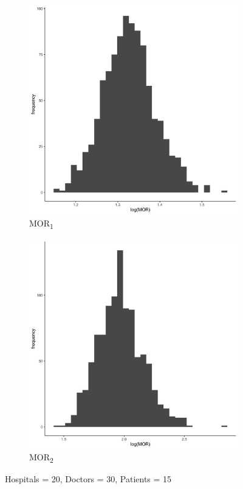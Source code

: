 \documentclass[
  letterpaper,
  DIV=11,
  numbers=noendperiod,
  titlepage]{scrartcl}
\begin{document}
\vspace{10mm}

\begin{figure}
\centering
\begin{subfigure}{.49\textwidth}
    \centering
    \includegraphics[width=.95\linewidth]{../../plots/three-lvl-ran-int/high-prev/hist_20_30_15_three_lvl_high_prev_mor1.png}  
    \caption{MOR\textsubscript{1}}
    \label{l20m30n151}
\end{subfigure}
\begin{subfigure}{.49\textwidth}
    \centering
    \includegraphics[width=.95\linewidth]{../../plots/three-lvl-ran-int/high-prev/hist_20_30_15_three_lvl_high_prev_mor2.png}
    \caption{MOR\textsubscript{2}}
    \label{l20m30n152}
\end{subfigure}
\caption{Hospitals = 20, Doctors = 30, Patients = 15}
\label{mor2}
\end{figure}
\end{document}

